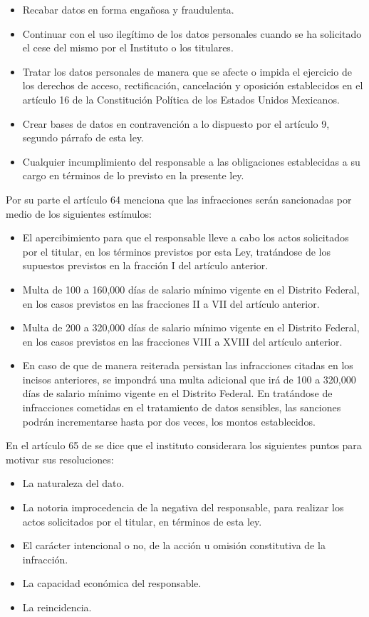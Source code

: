 \documentclass[runningheads,a4paper]{llncs}
\begin{document}
\begin{itemize}
	\item Recabar datos en forma engañosa y fraudulenta.
	\item Continuar con el uso ilegítimo de los datos personales cuando se ha solicitado el cese del mismo
por el Instituto o los titulares.
	\item Tratar los datos personales de manera que se afecte o impida el ejercicio de los derechos de
acceso, rectificación, cancelación y oposición establecidos en el artículo 16 de la Constitución
Política de los Estados Unidos Mexicanos.
	\item Crear bases de datos en contravención a lo dispuesto por el artículo 9, segundo párrafo de esta
ley.
	\item Cualquier incumplimiento del responsable a las obligaciones establecidas a su cargo en
términos de lo previsto en la presente ley.
\end{itemize}

Por su parte el artículo 64 menciona que las infracciones serán sancionadas por medio de los siguientes estímulos:

\begin{itemize}
	\item El apercibimiento para que el responsable lleve a cabo los actos solicitados por el titular, en los
términos previstos por esta Ley, tratándose de los supuestos previstos en la fracción I del
artículo anterior.
	\item Multa de 100 a 160,000 días de salario mínimo vigente en el Distrito Federal, en los casos
previstos en las fracciones II a VII del artículo anterior.
	\item Multa de 200 a 320,000 días de salario mínimo vigente en el Distrito Federal, en los casos
previstos en las fracciones VIII a XVIII del artículo anterior.
	\item En caso de que de manera reiterada persistan las infracciones citadas en los incisos anteriores,
se impondrá una multa adicional que irá de 100 a 320,000 días de salario mínimo vigente en el
Distrito Federal. En tratándose de infracciones cometidas en el tratamiento de datos sensibles,
las sanciones podrán incrementarse hasta por dos veces, los montos establecidos.
\end{itemize}

En el artículo 65 de \cite{LFPDPPP_1} se dice que el instituto considerara los siguientes puntos para motivar sus resoluciones:

\begin{itemize}
	\item La naturaleza del dato.
	\item La notoria improcedencia de la negativa del responsable, para realizar los actos solicitados por
el titular, en términos de esta ley.
	\item El carácter intencional o no, de la acción u omisión constitutiva de la infracción.
	\item La capacidad económica del responsable.
	\item La reincidencia.
\end{itemize}
\end{document}

